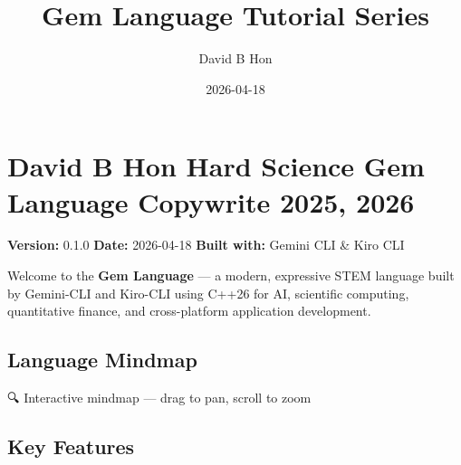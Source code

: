 \documentclass[
]{article}
\title{Gem Language Tutorial Series}
\author{David B Hon}
\date{2026-04-18}
\begin{document}
\maketitle

\section{David B Hon Hard Science Gem Language Copywrite 2025,
2026}\label{david-b-hon-hard-science-gem-language-copywrite-2025-2026}

\textbf{Version:} 0.1.0 \textbar{} \textbf{Date:} 2026-04-18 \textbar{}
\textbf{Built with:} Gemini CLI \& Kiro CLI

Welcome to the \textbf{Gem Language} --- a modern, expressive STEM
language built by Gemini-CLI and Kiro-CLI using C++26 for AI, scientific
computing, quantitative finance, and cross-platform application
development.

\subsection{Language Mindmap}\label{language-mindmap}

🔍 Interactive mindmap --- drag to pan, scroll to zoom

\subsection{Key Features}\label{key-features}
\end{document}
